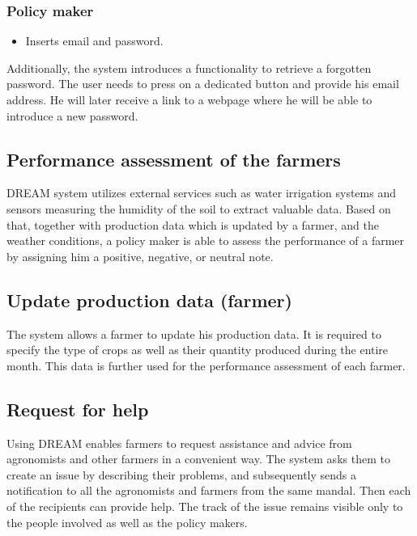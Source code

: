 \subsubsection*{Policy maker}

\begin{itemize}
    \item Inserts email and password.
\end{itemize}

Additionally, the system introduces a functionality to retrieve a forgotten password. The user needs to press on a dedicated button and provide his email address. He will later receive a link to a webpage where he will be able to introduce a new password. 

\subsection{Performance assessment of the farmers}

DREAM system utilizes external services such as water irrigation systems and sensors measuring the humidity of the soil to extract valuable data. Based on that, together with production data which is updated by a farmer, and the weather conditions, a policy maker is able to assess the performance of a farmer by assigning him a positive, negative, or neutral note.

\subsection{Update production data (farmer)}

The system allows a farmer to update his production data. It is required to specify the type of crops as well as their quantity produced during the entire month. This data is further used for the performance assessment of each farmer.

\subsection{Request for help}

Using DREAM enables farmers to request assistance and advice from agronomists and other farmers in a convenient way. The system asks them to create an issue by describing their problems, and subsequently sends a notification to all the agronomists and farmers from the same mandal. Then each of the recipients can provide help. The track of the issue remains visible only to the people involved as well as the policy makers.

